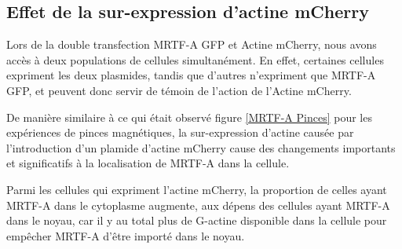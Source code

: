 \documentclass{report}
\begin{document}
\subsection{Effet de la sur-expression d'actine mCherry}

Lors de la double transfection MRTF-A GFP et Actine mCherry, nous avons accès à deux populations de cellules simultanément. En effet, certaines cellules expriment les deux plasmides, tandis que d'autres n'expriment que MRTF-A GFP, et peuvent donc servir de témoin de l'action de l'Actine mCherry. 

De manière similaire à ce qui était observé figure \ref{MRTF-A Pinces} pour les expériences de pinces magnétiques, la sur-expression d'actine causée par l'introduction d'un plamide d'actine mCherry cause des changements importants et significatifs à la localisation de MRTF-A dans la cellule. 

Parmi les cellules qui expriment l'actine mCherry, la proportion de celles ayant MRTF-A dans le cytoplasme augmente, aux dépens des cellules ayant MRTF-A dans le noyau, car il y au total plus de G-actine disponible dans la cellule pour empêcher MRTF-A d'être importé dans le noyau. 
\end{document}
